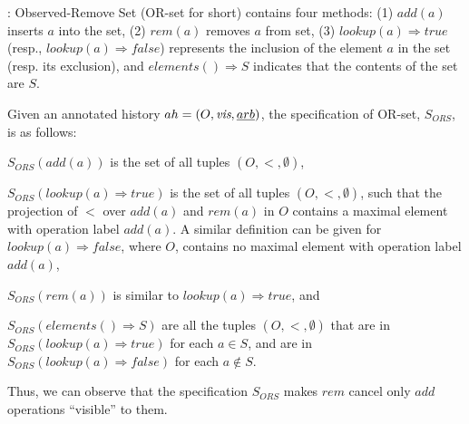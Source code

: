 :
%
Observed-Remove Set (OR-set for short)
\cite{Shapiro:2011,Bieniusa:2012} contains four methods: (1)
$\mathit{add}(a)$ inserts $a$ into the set, (2) $\mathit{rem}(a)$
removes $a$ from set, (3) \mbox{$\mathit{lookup}(a)\Rightarrow
  \mathit{true}$} (resp., \mbox{$\mathit{lookup}(a)\Rightarrow
  \mathit{false}$}) represents the inclusion of the element $a$ in the
set (resp. its exclusion), and $\mathit{elements}() \Rightarrow S$
indicates that the contents of the set are $S$.

Given an annotated history $ah = (O, \textit{vis}, \emph{arb})$, the
specification of OR-set, $S_{\mathit{ORS}}$, is as follows:
\begin{inparaenum}[(1)]
\item $S_{\mathit{ORS}}(\mathit{add}(a))$ is the set of all tuples
  $(O,<,\emptyset)$,
\item $S_{\mathit{ORS}}(\mathit{lookup}(a) \Rightarrow \mathit{true})$
  is the set of all tuples $(O,<,\emptyset)$, such that the projection
  of $<$ over $\mathit{add}(a)$ and $\mathit{rem}(a)$ in $O$ contains a
  maximal element with operation label $\mathit{add}(a)$.
  A similar definition can be given for $\mathit{lookup}(a)
  \Rightarrow \mathit{false}$, where $O$, contains no maximal element
  with operation label $\mathit{add}(a)$,
\item $S_{\mathit{ORS}}(\mathit{rem}(a))$ is similar to
  $\mathit{lookup}(a) \Rightarrow \mathit{true}$, and
\item $S_{\mathit{ORS}}(\mathit{elements}() \Rightarrow S)$ are all
  the tuples $(O,<,\emptyset)$ that are in
  $S_{\mathit{ORS}}(\mathit{lookup}(a) \Rightarrow \mathit{true})$ for
  each $a \in S$, and are in $S_{\mathit{ORS}}(\mathit{lookup}(a)
  \Rightarrow \mathit{false})$ for each $a \notin S$.
 \end{inparaenum}
 Thus, we can observe that the specification $S_{\mathit{ORS}}$ makes
 $\mathit{rem}$ cancel only $\mathit{add}$ operations ``visible'' to
 them.

